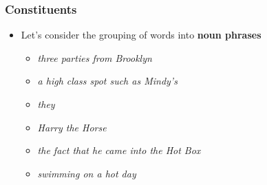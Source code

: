 \begin{frame}
\frametitle{Constituents}
\begin{itemize}
\item Let's consider the grouping of words into {\bf noun phrases}
\begin{itemize}
\item {\em three parties from Brooklyn}
\item {\em a high class spot such as Mindy's}
\item {\em they}
\item {\em Harry the Horse}
\item {\em the fact that he came into the Hot Box}
\item {\em swimming on a hot day}
\end{itemize}
\end{itemize}

\end{frame}

